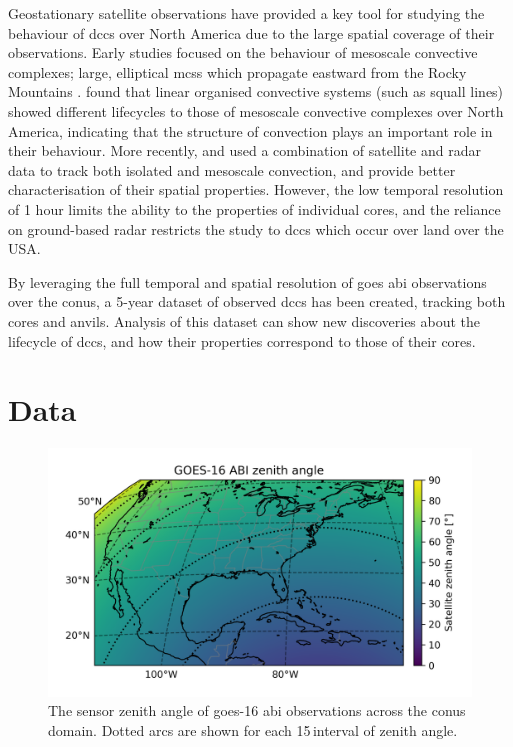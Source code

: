 Geostationary satellite observations have provided a key tool for studying the behaviour of \acrshort{dcc}s over North America due to the large spatial coverage of their observations.
Early studies focused on the behaviour of mesoscale convective complexes; large, elliptical \acrshort{mcs}s which propagate eastward from the Rocky Mountains \citep{maddox_mesoscale_1980, augustine_mesoscale_1988, augustine_mesoscale_1991}.
\citet{tsakraklides_global_2003a} found that linear organised convective systems (such as squall lines) showed different lifecycles to those of mesoscale convective complexes over North America, indicating that the structure of convection plays an important role in their behaviour.
More recently, \citet{feng_spatiotemporal_2019} and \citet{li_high-resolution_2021} used a combination of satellite and radar data to track both isolated and mesoscale convection, and provide better characterisation of their spatial properties.
However, the low temporal resolution of 1 hour limits the ability to the properties of individual cores, and the reliance on ground-based radar restricts the study to \acrshort{dcc}s which occur over land over the USA.

By leveraging the full temporal and spatial resolution of \acrshort{goes} \acrshort{abi} observations over the \acrshort{conus}, a 5-year dataset of observed \acrshort{dcc}s has been created, tracking both cores and anvils.
Analysis of this dataset can show new discoveries about the lifecycle of \acrshort{dcc}s, and how their properties correspond to those of their cores.

\section{Data}

\begin{figure}[tp]
    \centering
    \includegraphics[width=\textwidth]{figures/chapter2_01.png}
    \caption[
    The sensor zenith angle of \acrshort{goes}-16 \acrshort{abi} observations across the \acrshort{conus} domain
    ]{
    The sensor zenith angle of \acrshort{goes}-16 \acrshort{abi} observations across the \acrshort{conus} domain. Dotted arcs are shown for each 15\,\textdegree interval of zenith angle.
    }
    \label{fig:abi_zenith_angles}
\end{figure}

